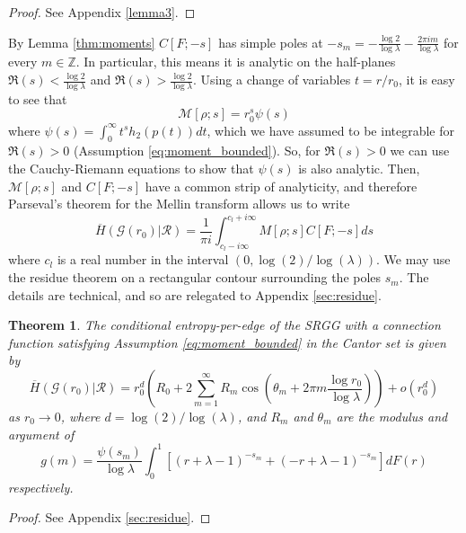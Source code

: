 \documentclass{article}
\newtheorem{theorem}{Theorem}
\newcommand{\graph}{\mathcal{G}}
\newcommand{\ttz}[0]{\rightarrow 0}
\begin{document}
\begin{proof}
    See Appendix \ref{lemma3}.
\end{proof}

By Lemma \ref{thm:moments} $C[F;-s]$ has simple poles at $-s_m = -\frac{\log 2}{\log \lambda} - \frac{2\pi im}{\log \lambda}$ for every $m \in \mathbb{Z}$. In particular, this means it is analytic on the half-planes $\Re(s) < \frac{\log 2}{\log \lambda}$ and $\Re(s) > \frac{\log 2}{\log \lambda}$. Using a change of variables $t = r/r_0$, it is easy to see that
\begin{equation}
    \mathcal{M}[\rho; s] = r_0^s\psi(s)
\end{equation}
where $\psi(s) = \int_0^{\infty} t^{s}h_2(p(t))dt$, which we have assumed to be integrable for $\Re(s) > 0$ (Assumption \ref{eq:moment_bounded}). So, for $\Re(s)>0$ we can use the Cauchy-Riemann equations to show that $\psi(s)$ is also analytic.
Then, $\mathcal{M}[\rho;s]$ and $C[F;-s]$ have a common strip of analyticity, and therefore Parseval's theorem for the Mellin transform allows us to write
\begin{equation}
    \label{eq:integral_to_compute}
    \overline{H}(\graph(r_0)|\mathcal{R}) = \frac{1}{\pi i}\int_{c_l-i\infty}^{c_l+i\infty}M[\rho;s]C[F;-s]ds
\end{equation}
where $c_l$ is a real number in the interval $(0, \log(2)/\log(\lambda))$. We may use the residue theorem on a rectangular contour surrounding the poles $s_m$. The details are technical, and so are relegated to Appendix \ref{sec:residue}.

\begin{theorem}
    \label{thm:cantor_entropy_expression}
    The conditional entropy-per-edge of the SRGG with a connection function satisfying Assumption \ref{eq:moment_bounded} in the Cantor set is given by
    \begin{equation}
        \overline{H}(\graph(r_0)|\mathcal{R}) = r_0^{d}\left(R_0 +2\sum_{m=1}^{\infty}R_m\cos\left(\theta_m + 2\pi m\frac{\log r_0}{\log \lambda} \right)\right) + o(r_0^d)
    \end{equation}
    as $r_0\ttz$, where $d = \log(2)/\log(\lambda)$, and $R_m$ and $\theta_m$ are the modulus and argument of \begin{equation*}
    g(m)= \frac{\psi(s_m)}{\log \lambda}\int_0^1\left[(r+\lambda-1)^{-s_m}+(-r+\lambda-1)^{-s_m}\right]dF(r)
    \end{equation*} 
    respectively.
\end{theorem}
\begin{proof}
    See Appendix \ref{sec:residue}.
\end{proof}
\end{document}
